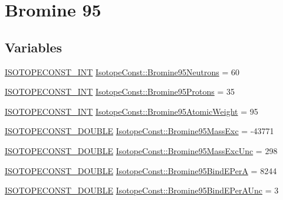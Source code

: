 \hypertarget{group___isotope_const-_bromine-_br95}{}\section{Bromine 95}
\label{group___isotope_const-_bromine-_br95}
\subsection*{Variables}
\begin{DoxyCompactItemize}
\item 
\mbox{\hyperlink{group___isotope_const-_macros_ga5f18360b3e99483a35c32d789e62621c}{I\+S\+O\+T\+O\+P\+E\+C\+O\+N\+S\+T\+\_\+\+I\+NT}} \mbox{\hyperlink{group___isotope_const-_bromine-_br95_ga494e669a40d9e7c6d89894f8b236f3cc}{Isotope\+Const\+::\+Bromine95\+Neutrons}} = 60
\item 
\mbox{\hyperlink{group___isotope_const-_macros_ga5f18360b3e99483a35c32d789e62621c}{I\+S\+O\+T\+O\+P\+E\+C\+O\+N\+S\+T\+\_\+\+I\+NT}} \mbox{\hyperlink{group___isotope_const-_bromine-_br95_gadb331379745bab0426c8a21eb660d2db}{Isotope\+Const\+::\+Bromine95\+Protons}} = 35
\item 
\mbox{\hyperlink{group___isotope_const-_macros_ga5f18360b3e99483a35c32d789e62621c}{I\+S\+O\+T\+O\+P\+E\+C\+O\+N\+S\+T\+\_\+\+I\+NT}} \mbox{\hyperlink{group___isotope_const-_bromine-_br95_ga8431bb270d5d3bbda3bae62d915a9ca8}{Isotope\+Const\+::\+Bromine95\+Atomic\+Weight}} = 95
\item 
\mbox{\hyperlink{group___isotope_const-_macros_ga8f45a7272ce02c0b4c65c44636ed719a}{I\+S\+O\+T\+O\+P\+E\+C\+O\+N\+S\+T\+\_\+\+D\+O\+U\+B\+LE}} \mbox{\hyperlink{group___isotope_const-_bromine-_br95_gaea5a98582f5bdaa2d9ed432c5f55417f}{Isotope\+Const\+::\+Bromine95\+Mass\+Exc}} = -\/43771
\item 
\mbox{\hyperlink{group___isotope_const-_macros_ga8f45a7272ce02c0b4c65c44636ed719a}{I\+S\+O\+T\+O\+P\+E\+C\+O\+N\+S\+T\+\_\+\+D\+O\+U\+B\+LE}} \mbox{\hyperlink{group___isotope_const-_bromine-_br95_ga787d770bdb2f7b09a476cc9b8eea05ee}{Isotope\+Const\+::\+Bromine95\+Mass\+Exc\+Unc}} = 298
\item 
\mbox{\hyperlink{group___isotope_const-_macros_ga8f45a7272ce02c0b4c65c44636ed719a}{I\+S\+O\+T\+O\+P\+E\+C\+O\+N\+S\+T\+\_\+\+D\+O\+U\+B\+LE}} \mbox{\hyperlink{group___isotope_const-_bromine-_br95_ga96f8221d8d022f700bcd3092f304fb25}{Isotope\+Const\+::\+Bromine95\+Bind\+E\+PerA}} = 8244
\item 
\mbox{\hyperlink{group___isotope_const-_macros_ga8f45a7272ce02c0b4c65c44636ed719a}{I\+S\+O\+T\+O\+P\+E\+C\+O\+N\+S\+T\+\_\+\+D\+O\+U\+B\+LE}} \mbox{\hyperlink{group___isotope_const-_bromine-_br95_gaecd8af41289c257e4d267f2b526d09c7}{Isotope\+Const\+::\+Bromine95\+Bind\+E\+Per\+A\+Unc}} = 3

\end{DoxyCompactItemize}
